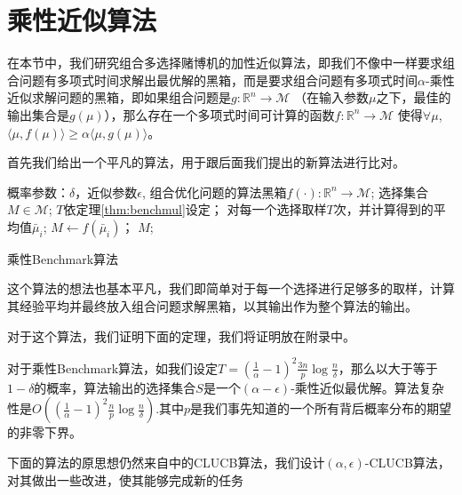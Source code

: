\documentclass[bachelor]{thuthesis}
\begin{document}
\section{乘性近似算法}

在本节中，我们研究组合多选择赌博机的加性近似算法，即我们不像\cite{cpemab}中一样要求组合问题有多项式时间求解出最优解的黑箱，而是要求组合问题有多项式时间$\alpha$-乘性近似求解问题的黑箱，即如果组合问题是$g:\mathbb{R}^n\to \mathcal{M}$ （在输入参数$\mu$之下，最佳的输出集合是$g(\mu)$），那么存在一个多项式时间可计算的函数$f:\mathbb{R}^n\to \mathcal{M}$ 使得$\forall \mu$, $\langle\mu,f(\mu)\rangle\ge\alpha \langle\mu,g(\mu)\rangle$。

首先我们给出一个平凡的算法，用于跟后面我们提出的新算法进行比对。

\begin{algorithm}[h]
\centering
\begin{algorithmic}
\REQUIRE 概率参数：$\delta$，近似参数$\epsilon$, 组合优化问题的算法黑箱$f(\cdot):\mathbb{R}^n\to \mathcal{M}$;
\ENSURE 选择集合 $M\in \mathcal{M}$;
\STATE $T$依定理\ref{thm:benchmul}设定；
\STATE 对每一个选择取样$T$次，并计算得到的平均值$\bar{\mu}_i$;
\STATE $M\gets f(\bar{\mu}_i)$；
\RETURN $M$;
\end{algorithmic}
\caption{乘性Benchmark算法}
\label{alg:benchmark}
\end{algorithm}

这个算法的想法也基本平凡，我们即简单对于每一个选择进行足够多的取样，计算其经验平均并最终放入组合问题求解黑箱，以其输出作为整个算法的输出。

对于这个算法，我们证明下面的定理，我们将证明放在附录中。

\begin{theorem}
\label{thm:benchmul}

对于乘性Benchmark算法，如我们设定$T=(\frac{1}{\alpha}-1)^2\frac{3n}{p}\log\frac{n}{\delta}$，那么以大于等于$1-\delta$的概率，算法输出的选择集合$S$是一个$(\alpha-\epsilon)$-乘性近似最优解。算法复杂性是$O\left((\frac{1}{\alpha}-1)^2\frac{n}{p}\log\frac{n}{\delta}\right)$.其中$p$是我们事先知道的一个所有背后概率分布的期望的非零下界。

\end{theorem}

下面的算法的原思想仍然来自\cite{cpemab}中的CLUCB算法，我们设计$(\alpha,\epsilon)$-CLUCB算法，对其做出一些改进，使其能够完成新的任务
\end{document}
